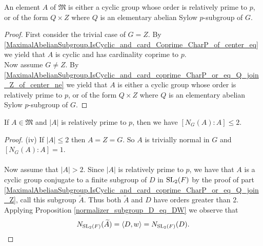 \begin{footnotesize}
\begin{theorem}
\label{MaximalAbelianSubgroup.IsCyclic_and_card_coprime_CharP_or_eq_Q_join_Z}
\leanok
An element $A$ of $\mathfrak{M}$ is either a cyclic group whose order is relatively prime to $p$, or of the form $Q \times Z$ where $Q$ is an elementary abelian Sylow $p$-subgroup of $G$. \vspace{3mm}
\end{theorem}
\begin{proof}
\leanok
  First consider the trivial case of $G=Z$.
  By \ref{MaximalAbelianSubgroup.IsCyclic_and_card_Coprime_CharP_of_center_eq} we yield that $A$ is cyclic and has cardinality coprime to $p$.
  \\
  Now assume $G \neq Z$.
  By \ref{MaximalAbelianSubgroup.IsCyclic_and_card_coprime_CharP_or_eq_Q_join_Z_of_center_ne} we yield that $A$ is either a cyclic group whose order is relatively prime to $p$, or of the form $Q \times Z$ where $Q$ is an elementary abelian Sylow $p$-subgroup of $G$.
\end{proof}


\begin{theorem}
  \label{MaximalAbelianSubgroup.index_normalizer_le_two}
  \leanok
If $A \in \mathfrak{M}$ and $|A|$ is relatively prime to $p$, then we have $[N_G(A): A] \leq 2$. 
\end{theorem}
\begin{proof}
  (iv) If $|A| \leq 2$ then $A=Z=G$. So $A$ is trivially normal in $G$ and $[N_G(A): A] = 1$. \\
  \\
  Now assume that $|A| > 2$. Since $|A|$ is relatively prime to $p$, we have that $A$ is a cyclic group conjugate to a finite subgroup of $D$ in $\operatorname{SL}_2(F)$ by the proof of part \ref{MaximalAbelianSubgroup.IsCyclic_and_card_coprime_CharP_or_eq_Q_join_Z}, call this subgroup ${\widetilde{A}}$. Thus both ${\widetilde{A}}$ and $D$ have orders greater than 2. Applying Proposition \ref{normalizer_subgroup_D_eq_DW} we observe that
  \begin{align}\label{norm1}  N_{\operatorname{SL}_2(F)}({\widetilde{A}}) = \langle D , w \rangle = N_{\operatorname{SL}_2(F)}(D).
  \end{align}
  

\end{proof}
\end{footnotesize}
